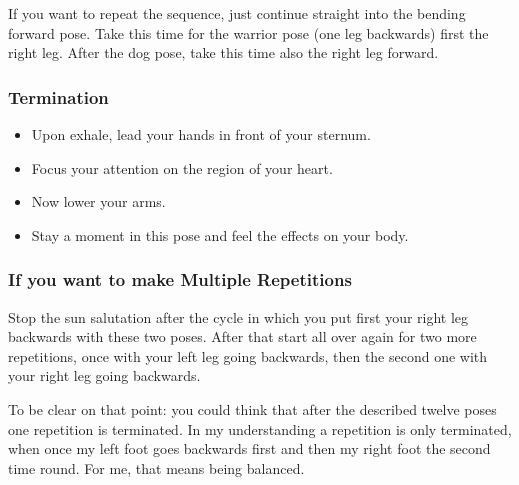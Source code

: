 \documentclass[../Book.Stress_regulation.tex]{subfiles}
\begin{document}
If you want to repeat the sequence, just continue straight into the bending forward pose.
Take this time for the warrior pose (one leg backwards) first the right leg.
After the dog pose, take this time also the right leg forward.

\subsubsection{Termination}

\begin{itemize}
\item Upon exhale, lead your hands in front of your sternum.
\item Focus your attention on the region of your heart.
\item Now lower your arms.
\item Stay a moment in this pose and feel the effects on your body.
\end{itemize}

\subsubsection{If you want to make Multiple Repetitions}

Stop the sun salutation after the cycle in which you put first your right leg backwards with these two poses.
After that start all over again for two more repetitions, once with your left leg going backwards, then the second one with your right leg going backwards.

To be clear on that point: you could think that after the described twelve poses one repetition is terminated.
In my understanding a repetition is only terminated, when once my left foot goes backwards first and then my right foot the second time round.
For me, that means being balanced.
\end{document}
